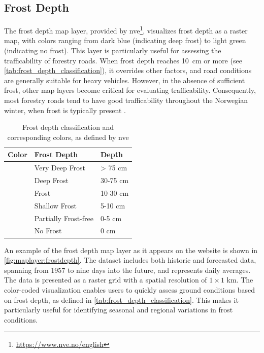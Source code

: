 \subsection{Frost Depth}\label{subsec:frostdepth}

The frost depth map layer, provided by \acrfull{nve}\footnote{\url{https://www.nve.no/english}}, visualizes frost depth as a raster map, with colors ranging from dark blue (indicating deep frost) to light green (indicating no frost). This layer is particularly useful for assessing the trafficability of forestry roads. When frost depth reaches \qty{10}{\centi\meter} or more (see \autoref{tab:frost_depth_classification}), it overrides other factors, and road conditions are generally suitable for heavy vehicles. However, in the absence of sufficient frost, other map layers become critical for evaluating trafficability. Consequently, most forestry roads tend to have good trafficability throughout the Norwegian winter, when frost is typically present \cite{wiki:tele}.

\begin{table}[h]
    \centering
    \begin{tabular}{|l|l|l|}
        \hline  
        \textbf{Color} & \textbf{Frost Depth} & \textbf{Depth} \\
        \hline
        \cellcolor[HTML]{00009c} & Very Deep Frost & > 75 cm \\
        \hline
        \cellcolor[HTML]{0018ff} & Deep Frost & 30-75 cm \\
        \hline
        \cellcolor[HTML]{009aff} & Frost & 10-30 cm \\
        \hline
        \cellcolor[HTML]{84ebff} & Shallow Frost & 5-10 cm \\
        \hline
        \cellcolor[HTML]{deffff} & Partially Frost-free & 0-5 cm \\
        \hline
        \cellcolor[HTML]{cef77b} & No Frost & 0 cm \\
        \hline
    \end{tabular}
    \caption[Frost depth classification and corresponding colors]{Frost depth classification and corresponding colors, as defined by \acrshort{nve} \cite{nve2025waterdata}}
    \label{tab:frost_depth_classification}
\end{table}

An example of the frost depth map layer as it appears on the website is shown in \autoref{fig:maplayer:frostdepth}. The dataset includes both historic and forecasted data, spanning from 1957 to nine days into the future, and represents daily averages. The data is presented as a raster grid with a spatial resolution of $1 \times 1$ km. The color-coded visualization enables users to quickly assess ground conditions based on frost depth, as defined in \autoref{tab:frost_depth_classification}. This makes it particularly useful for identifying seasonal and regional variations in frost conditions.

